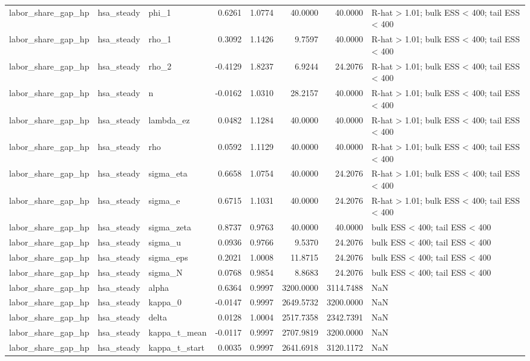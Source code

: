\begin{tabular}{lllrrrrl}
labor\_share\_gap\_hp & hsa\_steady & phi\_1 & 0.6261 & 1.0774 & 40.0000 & 40.0000 & R-hat > 1.01; bulk ESS < 400; tail ESS < 400 \\
labor\_share\_gap\_hp & hsa\_steady & rho\_1 & 0.3092 & 1.1426 & 9.7597 & 40.0000 & R-hat > 1.01; bulk ESS < 400; tail ESS < 400 \\
labor\_share\_gap\_hp & hsa\_steady & rho\_2 & -0.4129 & 1.8237 & 6.9244 & 24.2076 & R-hat > 1.01; bulk ESS < 400; tail ESS < 400 \\
labor\_share\_gap\_hp & hsa\_steady & n & -0.0162 & 1.0310 & 28.2157 & 40.0000 & R-hat > 1.01; bulk ESS < 400; tail ESS < 400 \\
labor\_share\_gap\_hp & hsa\_steady & lambda\_ez & 0.0482 & 1.1284 & 40.0000 & 40.0000 & R-hat > 1.01; bulk ESS < 400; tail ESS < 400 \\
labor\_share\_gap\_hp & hsa\_steady & rho & 0.0592 & 1.1129 & 40.0000 & 40.0000 & R-hat > 1.01; bulk ESS < 400; tail ESS < 400 \\
labor\_share\_gap\_hp & hsa\_steady & sigma\_eta & 0.6658 & 1.0754 & 40.0000 & 24.2076 & R-hat > 1.01; bulk ESS < 400; tail ESS < 400 \\
labor\_share\_gap\_hp & hsa\_steady & sigma\_e & 0.6715 & 1.1031 & 40.0000 & 24.2076 & R-hat > 1.01; bulk ESS < 400; tail ESS < 400 \\
labor\_share\_gap\_hp & hsa\_steady & sigma\_zeta & 0.8737 & 0.9763 & 40.0000 & 40.0000 & bulk ESS < 400; tail ESS < 400 \\
labor\_share\_gap\_hp & hsa\_steady & sigma\_u & 0.0936 & 0.9766 & 9.5370 & 24.2076 & bulk ESS < 400; tail ESS < 400 \\
labor\_share\_gap\_hp & hsa\_steady & sigma\_eps & 0.2021 & 1.0008 & 11.8715 & 24.2076 & bulk ESS < 400; tail ESS < 400 \\
labor\_share\_gap\_hp & hsa\_steady & sigma\_N & 0.0768 & 0.9854 & 8.8683 & 24.2076 & bulk ESS < 400; tail ESS < 400 \\
labor\_share\_gap\_hp & hsa\_steady & alpha & 0.6364 & 0.9997 & 3200.0000 & 3114.7488 & NaN \\
labor\_share\_gap\_hp & hsa\_steady & kappa\_0 & -0.0147 & 0.9997 & 2649.5732 & 3200.0000 & NaN \\
labor\_share\_gap\_hp & hsa\_steady & delta & 0.0128 & 1.0004 & 2517.7358 & 2342.7391 & NaN \\
labor\_share\_gap\_hp & hsa\_steady & kappa\_t\_mean & -0.0117 & 0.9997 & 2707.9819 & 3200.0000 & NaN \\
labor\_share\_gap\_hp & hsa\_steady & kappa\_t\_start & 0.0035 & 0.9997 & 2641.6918 & 3120.1172 & NaN \\

\end{tabular}
